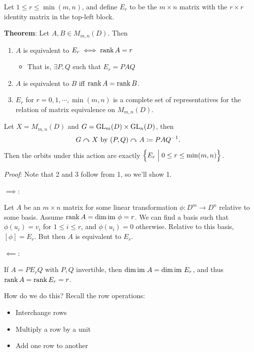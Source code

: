 Let \(1 \leq r \leq \min(m, n)\), and define \(E_r\) to be the
\(m\times n\) matrix with the \(r\times r\) identity matrix in the
top-left block.

\textbf{Theorem}: Let \(A, B \in M_{m,n}(D)\). Then

\begin{enumerate}
\def\labelenumi{\arabic{enumi}.}
\item
  \(A\) is equivalent to \(E_r \iff \operatorname{rank} A = r\)

  \begin{itemize}
  \tightlist
  \item
    That is, \(\exists P,Q\) such that \(E_r = PAQ\)
  \end{itemize}
\item
  \(A\) is equivalent to \(B\) iff \(\operatorname{rank} A = \operatorname{rank} B\).
\item
  \(E_r\) for \(r = 0, 1, \cdots, \min(m,n)\) is a complete set of
  representatives for the relation of matrix equivalence on
  \(M_{m, n}(D)\).
\end{enumerate}

Let \(X = M_{m, n}(D)\) and \(G = {\text{GL}}_m(D) \times {\text{GL}}_n(D)\), then \[
G \curvearrowright X \text{ by } (P, Q) \curvearrowright A \coloneqq PAQ^{-1}
.\] Then the orbits under this action are exactly
\(\left\{{E_r \mathrel{\Big|} 0 \leq r \leq \min(m, n)}\right\}\).

\emph{Proof}: Note that 2 and 3 follow from 1, so we'll show 1.

\(\implies\):

Let \(A\) be an \(m\times n\) matrix for some linear transformation
\(\phi: D^m \to D^n\) relative to some basis. Assume
\(\operatorname{rank} A = \dim {\text{im}~} \phi = r\). We can find a basis such that
\(\phi(u_i) = v_i\) for \(1 \leq i \leq r\), and \(\phi(u_i) = 0\)
otherwise. Relative to this basis, \([\phi] = E_r\). But then \(A\) is
equivalent to \(E_r\).

\(\impliedby\):

If \(A = PE_r Q\) with \(P, Q\) invertible, then
\(\dim {\text{im}~} A = \dim {\text{im}~} E_r\), and thus \(\operatorname{rank} A = \operatorname{rank} E_r = r\).

How do we do this? Recall the row operations:

\begin{itemize}
\item
  Interchange rows
\item
  Multiply a row by a unit
\item
  Add one row to another
\end{itemize}

